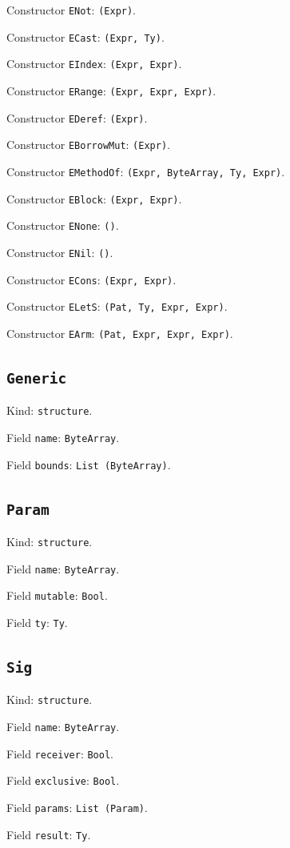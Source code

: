 \documentclass[11pt]{article}
\begin{document}
\noindent Constructor \texttt{ENot}: \texttt{(Expr)}.\par
\noindent Constructor \texttt{ECast}: \texttt{(Expr, Ty)}.\par
\noindent Constructor \texttt{EIndex}: \texttt{(Expr, Expr)}.\par
\noindent Constructor \texttt{ERange}: \texttt{(Expr, Expr, Expr)}.\par
\noindent Constructor \texttt{EDeref}: \texttt{(Expr)}.\par
\noindent Constructor \texttt{EBorrowMut}: \texttt{(Expr)}.\par
\noindent Constructor \texttt{EMethodOf}: \texttt{(Expr, ByteArray, Ty, Expr)}.\par
\noindent Constructor \texttt{EBlock}: \texttt{(Expr, Expr)}.\par
\noindent Constructor \texttt{ENone}: \texttt{()}.\par
\noindent Constructor \texttt{ENil}: \texttt{()}.\par
\noindent Constructor \texttt{ECons}: \texttt{(Expr, Expr)}.\par
\noindent Constructor \texttt{ELetS}: \texttt{(Pat, Ty, Expr, Expr)}.\par
\noindent Constructor \texttt{EArm}: \texttt{(Pat, Expr, Expr, Expr)}.\par
\subsection*{\texttt{Generic}}
\noindent Kind: \texttt{structure}.\par
\noindent Field \texttt{name}: \texttt{ByteArray}.\par
\noindent Field \texttt{bounds}: \texttt{List (ByteArray)}.\par
\subsection*{\texttt{Param}}
\noindent Kind: \texttt{structure}.\par
\noindent Field \texttt{name}: \texttt{ByteArray}.\par
\noindent Field \texttt{mutable}: \texttt{Bool}.\par
\noindent Field \texttt{ty}: \texttt{Ty}.\par
\subsection*{\texttt{Sig}}
\noindent Kind: \texttt{structure}.\par
\noindent Field \texttt{name}: \texttt{ByteArray}.\par
\noindent Field \texttt{receiver}: \texttt{Bool}.\par
\noindent Field \texttt{exclusive}: \texttt{Bool}.\par
\noindent Field \texttt{params}: \texttt{List (Param)}.\par
\noindent Field \texttt{result}: \texttt{Ty}.\par
\end{document}
